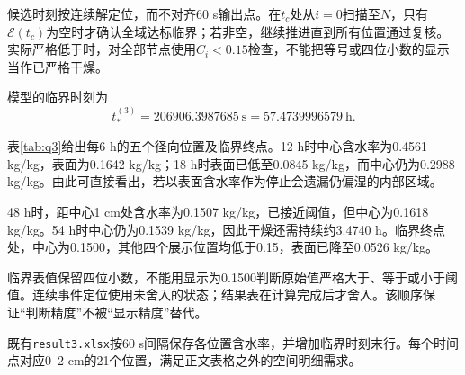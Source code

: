 候选时刻按连续解定位，而不对齐60 s输出点。在$t_c$处从$i=0$扫描至$N$，只有$\mathcal E(t_c)$为空时才确认全域达标临界；若非空，继续推进直到所有位置通过复核。实际严格低于时，对全部节点使用$C_i<0.15$检查，不能把等号或四位小数的显示当作已严格干燥。

模型的临界时刻为
\begin{equation}
t_*^{(3)}=206906.3987685\ \mathrm s
=57.4739996579\ \mathrm h .
\end{equation}



表\ref{tab:q3}给出每6 h的五个径向位置及临界终点。12 h时中心含水率为0.4561 kg/kg，表面为0.1642 kg/kg；18 h时表面已低至0.0845 kg/kg，而中心仍为0.2988 kg/kg。由此可直接看出，若以表面含水率作为停止会遗漏仍偏湿的内部区域。

48 h时，距中心1 cm处含水率为0.1507 kg/kg，已接近阈值，但中心为0.1618 kg/kg。54 h时中心仍为0.1539 kg/kg，因此干燥还需持续约3.4740 h。临界终点处，中心为0.1500，其他四个展示位置均低于0.15，表面已降至0.0526 kg/kg。

临界表值保留四位小数，不能用显示为0.1500判断原始值严格大于、等于或小于阈值。连续事件定位使用未舍入的状态；结果表在计算完成后才舍入。该顺序保证“判断精度”不被“显示精度”替代。

既有\texttt{result3.xlsx}按60 s间隔保存各位置含水率，并增加临界时刻末行。每个时间点对应0--2 cm的21个位置，满足正文表格之外的空间明细需求。